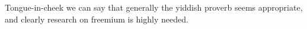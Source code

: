 Tongue-in-cheek we can say that generally the yiddish proverb  seems appropriate, and clearly research on freemium is highly needed.

% 
